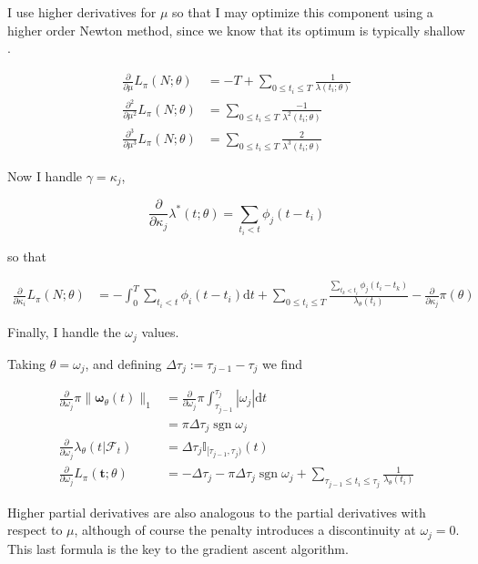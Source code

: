 \documentclass[11pt]{article}
\def\lt{<}
\newcommand{\dd}{\mathrm{d}}
\newcommand{\bb}[1]{\mathbb{#1}}
\renewcommand{\v}[1]{\boldsymbol{#1}}
\newcommand{\oo}[1]{\operatorname{#1}}
\begin{document}
I use higher derivatives for \(\mu\) so that I may optimize this
component using a higher order Newton method, since we know that its
optimum is typically shallow \cite{veen_estimation_2008}.

\[\begin{aligned}
  { \scriptstyle \frac{\partial}{\partial\mu} } L_\pi(N;\theta) &=-T + \sum_{0\leq t_i\leq T} \frac{1}{\lambda(t_i;\theta)} \\
  { \scriptstyle \frac{\partial^2}{\partial\mu^2} } L_\pi(N;\theta) &= \sum_{0\leq t_i\leq T} \frac{-1}{\lambda^2(t_i;\theta)}\\
  { \scriptstyle \frac{\partial^3}{\partial\mu^3} } L_\pi(N;\theta) &= \sum_{0\leq t_i\leq T} \frac{2}{\lambda^3(t_i;\theta)}
  \end{aligned}\]

    Now I handle \(\gamma=\kappa_j\),

\[{ \scriptstyle \frac{\partial}{\partial\kappa_j} }\lambda^*(t;\theta) =  \sum_{t_i\lt t}\phi_j(t-t_i)\]

so that

\[\begin{aligned}
  { \scriptstyle \frac{\partial}{\partial\kappa_i} } L_\pi(N; \theta)&=-\int_0^T \sum_{t_i\lt t}\phi_i(t-t_i) \dd t + \sum_{0\leq t_i\leq T} \frac{\sum_{t_k\lt t_i}\phi_j(t_i-t_k)}{\lambda_\theta(t_i)} -\frac{\partial}{\partial\kappa_j}\pi(\theta)
\end{aligned}\]

    Finally, I handle the \(\omega_j\) values.

Taking \(\theta=\omega_j\), and defining
\(\Delta\tau_j:= {\tau_{j-1}}-{\tau_j}\) we find

\[\begin{aligned}
{ \scriptstyle \frac{\partial}{\partial\omega_j} }\pi\|\v \omega_\theta(t)\|_1 &= { \scriptstyle \frac{\partial}{\partial\omega_j} }\pi \int_{\tau_{j-1}}^{\tau_j} \left|\omega_j\right|\dd t\\
&=\pi\Delta\tau_j\oo{sgn} \omega_j\\
{ \scriptstyle \frac{\partial}{\partial\omega_j} }\lambda_\theta(t|\mathcal{F}_t) &=  \Delta\tau_j\bb{I}_{[\tau_{j-1},\tau_j)}(t)\\
{ \scriptstyle \frac{\partial}{\partial\omega_j} } L_\pi(\v t;\theta) &=-\Delta\tau_j-\pi\Delta\tau_j\oo{sgn} \omega_j + \sum_{\tau_{j-1}\leq t_i\leq \tau_j} \frac{1}{\lambda_\theta(t_i)}
\end{aligned}\]

Higher partial derivatives are also analogous to the partial derivatives
with respect to \(\mu\), although of course the penalty introduces a
discontinuity at \(\omega_j=0\). This last formula is the key to the
gradient ascent algorithm.
\end{document}
